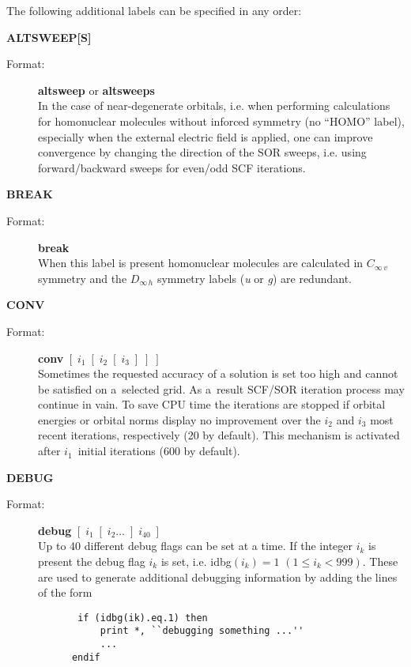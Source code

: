 \documentclass[10pt,a4paper]{article}
\begin{document}
The following additional labels can be specified in any order:
\begin{description}

\item \textbf{ALTSWEEP[S]}
\begin{description}
\item[Format:] \textbf{altsweep} or \textbf{altsweeps}\\
  In the case of near-degenerate orbitals, i.e. when performing calculations
  for homonuclear molecules without inforced symmetry (no ``HOMO'' label),
  especially when the external electric field is applied, one can improve
  convergence by changing the direction of the SOR sweeps, i.e. using forward/backward
  sweeps for even/odd SCF iterations.
\end{description}
  
\item \textbf{BREAK}
\begin{description}
\item[Format:] \textbf{break} \\ When this label is present homonuclear molecules are
  calculated in $C_{\infty\,v}$ symmetry and the $D_{\infty\,h}$ symmetry labels ({\it u}
  or {\it g}) are redundant.

\end{description}


\item \textbf{CONV}
\begin{description}
\item[Format:] \textbf{conv} $[\;i_1\;[\;i_2\;[\;i_3\;]\;]\;]$\\ Sometimes the requested
  accuracy of a solution is set too high and cannot be satisfied on a~selected grid. As
  a~result SCF/SOR iteration process may continue in vain. To save CPU time the iterations
  are stopped if orbital energies or orbital norms display no improvement over the $i_2$
  and $i_3$ most recent iterations, respectively (20 by default). This mechanism is
  activated after $i_1$~initial iterations (600 by default).
\end{description}

\item \textbf{DEBUG}
\begin{description}
\item[Format:] \textbf{debug} $[\; i_1 \; [\;i_2 \ldots \;] \;i_{40}\;]$ \\
  Up to 40 different debug flags can be set at a time.
  If the integer $i_k$ is present the debug flag $i_k$ is set, i.e. idbg$(i_k)=1$ $(1 \leq
  i_k<999)$. These are used to generate additional debugging information by adding the
  lines of the form
  \begin{verbatim}
       if (idbg(ik).eq.1) then
           print *, ``debugging something ...''
           ...
      endif
    \end{verbatim}
\end{description}


\end{description}
\end{document}
